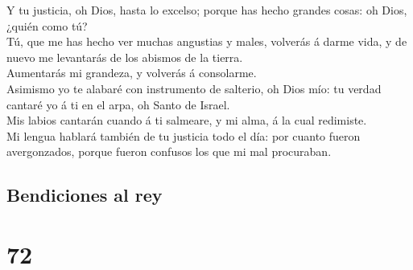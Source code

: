  Y tu justicia, oh Dios, hasta lo excelso; porque has
hecho grandes cosas: oh Dios, ¿quién como tú?\\
 Tú, que me has hecho ver muchas angustias y males,
volverás á darme vida, y de nuevo me levantarás de los abismos de la
tierra.\\
 Aumentarás mi grandeza, y volverás á consolarme.\\
 Asimismo yo te alabaré con instrumento de salterio, oh
Dios mío: tu verdad cantaré yo á ti en el arpa, oh Santo de Israel.\\
 Mis labios cantarán cuando á ti salmeare, y mi alma, á
la cual redimiste.\\
 Mi lengua hablará también de tu justicia todo el día:
por cuanto fueron avergonzados, porque fueron confusos los que mi mal
procuraban.

\hypertarget{bendiciones-al-rey}{%
\subsection{Bendiciones al rey}\label{bendiciones-al-rey}}

\hypertarget{section-19-72}{%
\section{72}\label{section-19-72}}

